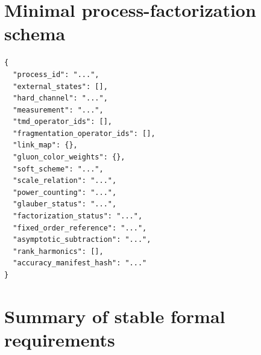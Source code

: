 \documentclass[11pt]{article}
\begin{document}
\section{Minimal process-factorization schema}
\label{app:process-schema}

\begin{verbatim}
{
  "process_id": "...",
  "external_states": [],
  "hard_channel": "...",
  "measurement": "...",
  "tmd_operator_ids": [],
  "fragmentation_operator_ids": [],
  "link_map": {},
  "gluon_color_weights": {},
  "soft_scheme": "...",
  "scale_relation": "...",
  "power_counting": "...",
  "glauber_status": "...",
  "factorization_status": "...",
  "fixed_order_reference": "...",
  "asymptotic_subtraction": "...",
  "rank_harmonics": [],
  "accuracy_manifest_hash": "..."
}
\end{verbatim}

\section{Summary of stable formal requirements}
\label{app:requirements}
\end{document}
